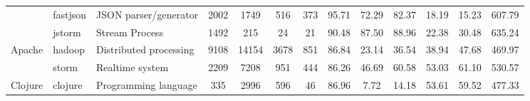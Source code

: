\begin{table*}[]
{\begin{tabular}{lll|ccc|cccc|ccc}
                            & fastjson                                                      & JSON parser/generator                                                    & 2002           & 1749            & 516                                                              & 373            & 95.71          & 72.29          & 82.37          & 18.19                                                             & 15.23                                                              & 607.79                                               \\
                            & jstorm                                                        & Stream Process                                                           & 1492           & 215             & 24                                                               & 21             & 90.48          & 87.50          & 88.96          & 22.38                                                             & 30.48                                                              & 635.24                                               \\ \hline
\multirow{2}{*}{Apache}     & hadoop                                                        & Distributed processing                                                   & 9108           & 14154           & 3678                                                             & 851            & 86.84          & 23.14          & 36.54          & 38.94                                                             & 47.68                                                              & 469.97                                               \\
                            & storm                                                         & Realtime system                                                          & 2209           & 7208            & 951                                                              & 444            & 86.26          & 46.69          & 60.58          & 53.03                                                             & 61.10                                                              & 530.57                                               \\ \hline
Clojure                     & clojure                                                       & Programming language                                                     & 335            & 2996            & 596                                                              & 46             & 86.96          & 7.72           & 14.18          & 53.61                                                             & 59.52                                                              & 477.33                                               \\ \hline

\end{tabular}}
\end{table*}
